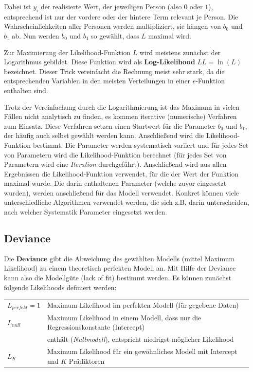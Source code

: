 \documentclass{article}
\numberwithin{equation}{section}
\begin{document}
Dabei ist $y_i$ der realisierte Wert, der jeweiligen Person (also $0$ oder $1$), entsprechend ist nur der vordere oder der hintere Term relevant je Person. Die Wahrscheinlichkeiten aller Personen werden multipliziert, sie hängen von $b_0$ und $b_1$ ab. Nun werden $b_0$ und $b_1$ so gewählt, dass $L$ maximal wird.

Zur Maximierung der Likelihood-Funktion $L$ wird meistens zunächst der Logarithmus gebildet. Diese Funktion wird als \textbf{Log-Likelihood} $LL = \ln(L)$ bezeichnet. Dieser Trick vereinfacht die Rechnung meist sehr stark, da die entsprechenden Variablen in den meisten Verteilungen in einer $e$-Funktion enthalten sind.

Trotz der Vereinfachung durch die Logarithmierung ist das Maximum in vielen Fällen nicht analytisch zu finden, es kommen iterative (numerische) Verfahren zum Einsatz. Diese Verfahren setzen einen Startwert für die Parameter $b_0$ und $b_1$, der häufig auch selbst gewählt werden kann. Anschließend wird die Likelihood-Funktion bestimmt. Die Parameter werden systematisch variiert und für jedes Set von Parametern wird die Likelihood-Funktion berechnet (für jedes Set von Parametern wird eine \emph{Iteration} durchgeführt). Anschließend wird aus allen Ergebnissen die Likelihood-Funktion verwendet, für die der Wert der Funktion maximal wurde. Die darin enthaltenen Parameter (welche zuvor eingesetzt wurden), werden anschließend für das Modell verwendet. Konkret können viele unterschiedliche Algorithmen verwendet werden, die sich z.B. darin unterscheiden, nach welcher Systematik Parameter eingesetzt werden.

\subsection{Deviance}
\label{sec:deviance}

Die \textbf{Deviance} gibt die Abweichung des gewählten Modells (mittel Maximum Likelihood) zu einem theoretisch perfekten Modell an. Mit Hilfe der Deviance kann also die Modellgüte (lack of fit) bestimmt werden. Es können zunächst folgende Likelihoods definiert werden:

\begin{tabular}{ll}
$L_{perfekt} = 1$ & Maximum Likelihood im perfekten Modell (für gegebene Daten)\\
$L_{null}$ & Maximum Likelihood in einem Modell, dass nur die Regressionskonstante (Intercept)\\ & enthält (\emph{Nullmodell}), entspricht niedrigst möglicher Likelihood\\
$L_{K}$ & Maximum Likelihood für ein gewöhnliches Modell mit Intercept und $K$ Prädiktoren
\end{tabular}
\end{document}

